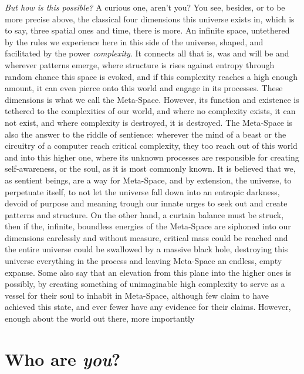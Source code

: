 \documentclass[a4paper,12pt]{report}
\begin{document}
{\textit{But how is this possible?} A curious one, aren't you? You see, besides, or to be more precise above, the classical four dimensions this universe exists in, which is to say, three spatial ones and time, there is more. An infinite space, untethered by the rules we experience here in this side of the universe, shaped, and facilitated by the power \textit{complexity}. It connects all that is, was and will be and wherever patterns emerge, where structure is rises against entropy through random chance this space is evoked, and if this complexity reaches a high enough amount, it can even pierce onto this world and engage in its processes. These dimensions is what we call the Meta-Space. However, its function and existence is tethered to the complexities of our world, and where no complexity exists, it can not exist, and where complexity is destroyed, it is destroyed. The Meta-Space is also the answer to the riddle of sentience: wherever the mind of a beast or the circuitry of a computer reach critical complexity, they too reach out of this world and into this higher one, where its unknown processes are responsible for creating self-awareness, or the soul, as it is most commonly known. It is believed that we, as sentient beings, are a way for Meta-Space, and by extension, the universe, to perpetuate itself, to not let the universe fall down into an entropic darkness, devoid of purpose and meaning trough our innate urges to seek out and create patterns and structure. On the other hand, a curtain balance must be struck, then if the, infinite, boundless energies of the Meta-Space are siphoned into our dimensions carelessly and without measure, critical mass could be reached and the entire universe could be swallowed  by a massive black hole, destroying this universe everything in the process and leaving Meta-Space an endless, empty expanse. Some also say that an elevation from this plane into the higher ones is possibly, by creating something of unimaginable high complexity to serve as a vessel for their soul to inhabit in Meta-Space, although few claim to have achieved this state, and ever fewer have any evidence for their claims.
However, enough about the world out there, more importantly}

\pagebreak

\section{Who are \textit{you}?}
\end{document}
